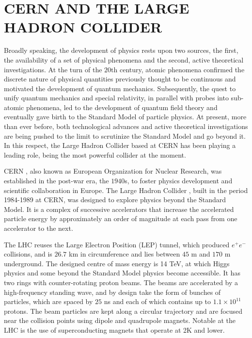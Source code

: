 



\section{CERN AND THE LARGE HADRON COLLIDER}


Broadly speaking, the development of physics rests upon two sources, the first,
the availability of a set of physical phenomena and the second, active
theoretical investigations. At the turn of the $20$th century, atomic phenomena
confirmed the discrete nature of physical quantities previously thought to be
continuous and motivated the development of quantum mechanics. Subsequently,
the quest to unify quantum mechanics and special relativity, in parallel with
probes into sub-atomic phenomena, led to the development of quantum field
theory and eventually gave birth to the Standard Model of particle physics. At
present, more than ever before, both technological advances and active
theoretical investigations are being pushed to the limit to scrutinize the
Standard Model and go beyond it. In this respect, the Large Hadron Collider
based at CERN has been playing a leading role, being the most powerful collider
at the moment.

CERN \cite{cernlink}, also known as European Organization for Nuclear Research,
was established in the post-war era, the $1940$s, to foster physics development
and scientific collaboration in Europe. The Large Hadron Collider
\cite{lhclink}, built in the period 1984-1989 at CERN, was designed to explore
physics beyond the Standard Model. It is a complex of successive accelerators
that increase the accelerated particle energy by approximately an order of
magnitude at each pass from one accelerator to the next.


The LHC reuses the Large Electron Position (LEP) tunnel, which produced
$e^+e^-$ collisions, and is $26.7$ km in circumference and lies between $45$ m
and $170$ m underground. The designed centre of mass energy is 14 TeV, at which
Higgs physics and some beyond the Standard Model physics become accessible. It
has two rings with counter-rotating proton beams. The beams are accelerated by
a high-frequency standing wave, and by design take the form of bunches of
particles, which are spaced by $25$ ns and each of which contains up to
$1.1\times 10^{11}$ protons. The beam particles are kept along a circular
trajectory and are focused near the collision points using dipole and
quadrupole magnets. Notable at the LHC is the use of superconducting magnets
that operate at 2K and lower.

